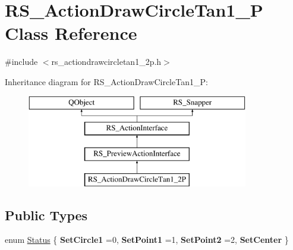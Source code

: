 \hypertarget{classRS__ActionDrawCircleTan1__2P}{\section{R\-S\-\_\-\-Action\-Draw\-Circle\-Tan1\-\_\-P Class Reference}
\label{classRS__ActionDrawCircleTan1__2P}
}


{\ttfamily \#include $<$rs\-\_\-actiondrawcircletan1\-\_\-2p.\-h$>$}

Inheritance diagram for R\-S\-\_\-\-Action\-Draw\-Circle\-Tan1\-\_\-P\-:\begin{figure}[H]
\begin{center}
\leavevmode
\includegraphics[height=4.000000cm]{classRS__ActionDrawCircleTan1__2P}
\end{center}
\end{figure}
\subsection*{Public Types}
\begin{DoxyCompactItemize}
\item 
enum \hyperlink{classRS__ActionDrawCircleTan1__2P_a373f052ae219b6fe648ad61142e91e87}{Status} \{ {\bfseries Set\-Circle1} =0, 
{\bfseries Set\-Point1} =1, 
{\bfseries Set\-Point2} =2, 
{\bfseries Set\-Center}
 \}
\end{DoxyCompactItemize}

